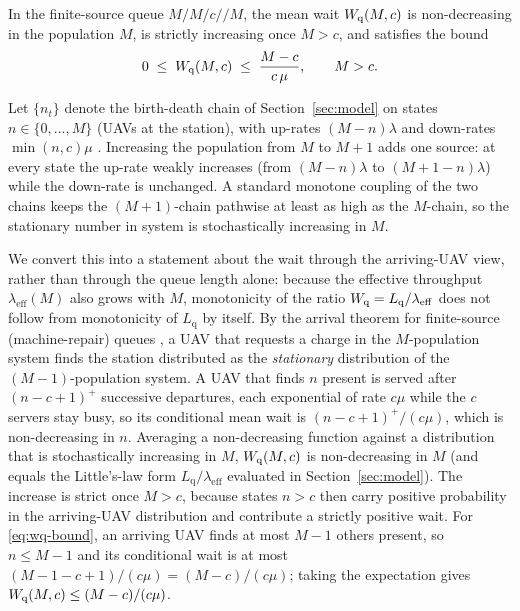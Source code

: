 \begin{lemma}
\label{lem:wq}
In the finite-source queue $M/M/c//M$, the mean wait $W_{\mathrm q}(M,c)$ is non-decreasing
in the population $M$, is strictly increasing once $M>c$, and satisfies the bound
\begin{equation}
\label{eq:wq-bound}
0 \;\le\; W_{\mathrm q}(M,c) \;\le\; \frac{M-c}{c\,\mu}, \qquad M>c .
\end{equation}
\end{lemma}

\begin{IEEEproof}
Let $\{n_t\}$ denote the birth-death chain of Section~\ref{sec:model} on states
$n\in\{0,\dots,M\}$ (UAVs at the station), with up-rates $(M-n)\lambda$ and
down-rates $\min(n,c)\mu$ \cite{grossharris}. Increasing the population from $M$
to $M+1$ adds one source: at every state the up-rate weakly increases (from
$(M-n)\lambda$ to $(M{+}1-n)\lambda$) while the down-rate is unchanged. A standard
monotone coupling of the two chains keeps the $(M{+}1)$-chain pathwise at least as
high as the $M$-chain, so the stationary number in system is stochastically
increasing in $M$.

We convert this into a statement about the wait through the arriving-UAV view,
rather than through the queue length alone: because the effective throughput
$\lambda_{\mathrm{eff}}(M)$ also grows with $M$, monotonicity of the ratio
$W_{\mathrm q}=L_{\mathrm q}/\lambda_{\mathrm{eff}}$ does not follow from monotonicity of
$L_{\mathrm q}$ by itself. By the arrival theorem for finite-source
(machine-repair) queues \cite{grossharris}, a UAV that requests a charge in the
$M$-population system finds the station distributed as the \emph{stationary}
distribution of the $(M{-}1)$-population system. A UAV that finds $n$ present is
served after $(n-c+1)^{+}$ successive departures, each exponential of rate $c\mu$
while the $c$ servers stay busy, so its conditional mean wait is
$(n-c+1)^{+}/(c\mu)$, which is non-decreasing in $n$. Averaging a non-decreasing
function against a distribution that is stochastically increasing in $M$,
$W_{\mathrm q}(M,c)$ is non-decreasing in $M$ (and equals the Little's-law form
$L_{\mathrm q}/\lambda_{\mathrm{eff}}$ evaluated in Section~\ref{sec:model}). The
increase is strict once $M>c$, because states $n>c$ then carry positive
probability in the arriving-UAV distribution and contribute a strictly positive
wait. For \eqref{eq:wq-bound}, an arriving UAV finds at most $M-1$ others present,
so $n\le M-1$ and its conditional wait is at most
$(M-1-c+1)/(c\mu)=(M-c)/(c\mu)$; taking the expectation gives
$W_{\mathrm q}(M,c)\le (M-c)/(c\mu)$.
\end{IEEEproof}

